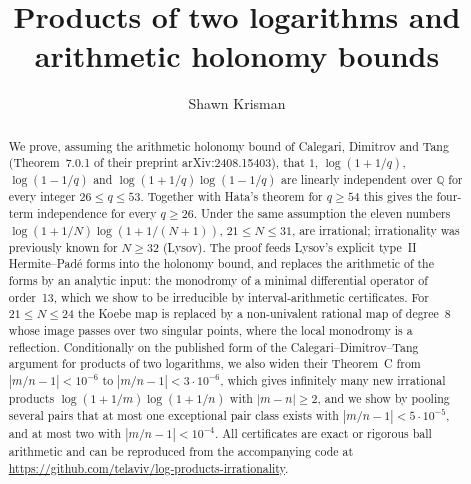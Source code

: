 \documentclass[11pt]{amsart}
\theoremstyle{definition}
\theoremstyle{remark}
\numberwithin{equation}{section}
\newcommand{\QQ}{\mathbb{Q}}
\begin{document}
\title[Products of two logarithms]{Products of two logarithms and arithmetic holonomy bounds}

\author{Shawn Krisman}


\begin{abstract}
We prove, assuming the arithmetic holonomy bound of Calegari, Dimitrov and Tang (Theorem~7.0.1 of their preprint
arXiv:2408.15403), that $1$, $\log(1+1/q)$, $\log(1-1/q)$ and $\log(1+1/q)\log(1-1/q)$ are linearly independent over
$\QQ$ for every integer $26\le q\le53$. Together with Hata's theorem for $q\ge54$ this gives the four-term independence
for every $q\ge26$. Under the same assumption the eleven numbers $\log(1+1/N)\log(1+1/(N+1))$, $21\le N\le31$, are
irrational; irrationality was previously known for $N\ge32$ (Lysov). The proof feeds Lysov's explicit type~II
Hermite--Pad\'e forms into the holonomy bound, and replaces the arithmetic of the forms by an analytic input: the
monodromy of a minimal differential operator of order~13, which we show to be irreducible by interval-arithmetic
certificates. For $21\le N\le24$ the Koebe map is replaced by a non-univalent rational map of degree~$8$ whose image
passes over two singular points, where the local monodromy is a reflection. Conditionally
on the published form of the Calegari--Dimitrov--Tang argument for products of two logarithms, we also widen their
Theorem~C from $|m/n-1|<10^{-6}$ to $|m/n-1|<3\cdot10^{-6}$, which gives infinitely many new irrational products
$\log(1+1/m)\log(1+1/n)$ with $|m-n|\ge2$, and we show by pooling several pairs that at most one exceptional pair
class exists with $|m/n-1|<5\cdot10^{-5}$, and at most two with $|m/n-1|<10^{-4}$. All certificates are exact or
rigorous ball arithmetic and can be reproduced from the accompanying code at
\url{https://github.com/telaviv/log-products-irrationality}.
\end{abstract}

\maketitle

\end{document}

